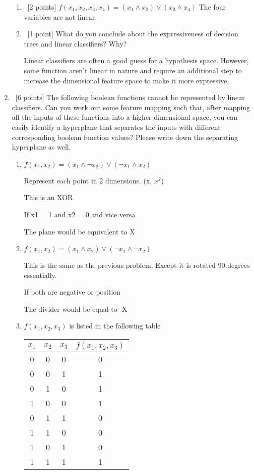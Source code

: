 \documentclass[12pt, fullpage,letterpaper]{article}
\begin{document}
\begin{enumerate}
\begin{enumerate}
		\item~[2 points] $f(x_1, x_2, x_3, x_4) = (x_1 \land x_2) \lor (x_3 \land x_4)$ \newline
The four variables are not linear.

		\item~[1 point] What do you conclude about the expressiveness of decision trees and linear classifiers? Why? \newline

Linear classifiers are often a good guess for a hypothesis space. However, some function aren't linear in nature and require an additional step to increase the dimensional feature space to make it more expressive.
	\end{enumerate}
		
	
	\item~[6 points] The following boolean functions cannot be represented by linear classifiers. Can you work out some feature mapping such that, after mapping all the inputs of these functions into a higher dimensional space, you can easily identify a hyperplane that separates the inputs with different corresponding boolean function values? Please write down the separating hyperplane as well. 
	\begin{enumerate}
		\item $f(x_1, x_2) = (x_1 \land \neg x_2) \lor (\neg x_1 \land x_2) $ \newline

Represent each point in 2 dimensions. (x, $x^2$)

This is an XOR

If x1 = 1 and x2 = 0 and vice versa

The plane would be equivalent to X

		\item $f(x_1, x_2) = (x_1 \land x_2) \lor (\neg x_1 \land \neg x_2)$ \newline

This is the same as the previous problem. Except it is rotated 90 degrees essentially. 

If both are negative or position

The divider would be equal to -X

		\item $f(x_1, x_2, x_3)$ is listed in the following table
		\begin{table}[h]
			\centering
			\begin{tabular}{ccc|c}
				$x_1$ & $x_2$ & $x_3$ &  $f(x_1, x_2, x_3)$\\ 
				\hline\hline
				0 & 0 & 0 & 0 \\ \hline
				0 & 0 & 1 & 1 \\ \hline
				0 & 1 & 0 & 1 \\ \hline
				1 & 0 & 0 & 1 \\ \hline
				0 & 1 & 1 & 0\\ \hline
				1 & 1 & 0 & 0\\ \hline
				1 & 0 & 1 & 0\\ \hline
				1 & 1 & 1 & 1\\ \hline
			\end{tabular}
		\end{table}


\end{enumerate}
\end{enumerate}
\end{document}
